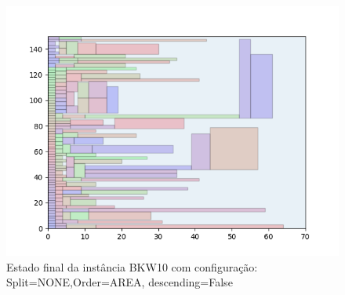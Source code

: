 \begin{figure}[H]
    \centering
    \caption[]{Estado final da instância BKW10 com configuração: Split=NONE,Order=AREA, descending=False}
    \label{fig:bkw10-none-area-false}
    \includegraphics[scale=0.5]{output/figures/bkw/bkw10/none/area/false/000}
\end{figure}